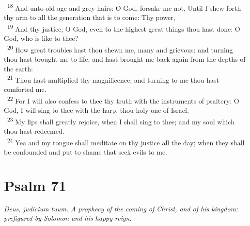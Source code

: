 \documentclass[a5paper,12pt]{article}
\begin{document}
\begin{multicols*}{2}
~\textsuperscript{18} And unto old age and grey hairs: O God, forsake me not, Until I shew forth thy arm to all the generation that is to come: Thy power,\\
~\textsuperscript{19} And thy justice, O God, even to the highest great things thou hast done: O God, who is like to thee?\\
~\textsuperscript{20} How great troubles hast thou shewn me, many and grievous: and turning thou hast brought me to life, and hast brought me back again from the depths of the earth:\\
~\textsuperscript{21} Thou hast multiplied thy magnificence; and turning to me thou hast comforted me.\\
~\textsuperscript{22} For I will also confess to thee thy truth with the instruments of psaltery: O God, I will sing to thee with the harp, thou holy one of Israel.\\
~\textsuperscript{23} My lips shall greatly rejoice, when I shall sing to thee; and my soul which thou hast redeemed.\\
~\textsuperscript{24} Yea and my tongue shall meditate on thy justice all the day; when they shall be confounded and put to shame that seek evils to me.\\

\section{Psalm 71}
\label{sec:org73dbf33}
\emph{Deus, judicium tuum. A prophecy of the coming of Christ, and of his kingdom: prefigured by Solomon and his happy reign.}\\


\end{multicols*}
\end{document}

